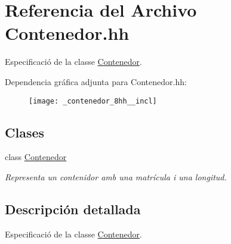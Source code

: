 \hypertarget{_contenedor_8hh}{}\section{Referencia del Archivo Contenedor.\+hh}
\label{_contenedor_8hh}


Especificació de la classe \hyperlink{class_contenedor}{Contenedor}.  


Dependencia gráfica adjunta para Contenedor.\+hh\+:\nopagebreak
\begin{figure}[H]
\begin{center}
\leavevmode
\texttt{[image: \_contenedor\_8hh\_\_incl]}
\end{center}
\end{figure}
\subsection*{Clases}
\begin{DoxyCompactItemize}
\item 
class \hyperlink{class_contenedor}{Contenedor}
\begin{DoxyCompactList}\small\item\em Representa un contenidor amb una matrícula i una longitud. \end{DoxyCompactList}\end{DoxyCompactItemize}


\subsection{Descripción detallada}
Especificació de la classe \hyperlink{class_contenedor}{Contenedor}. 

